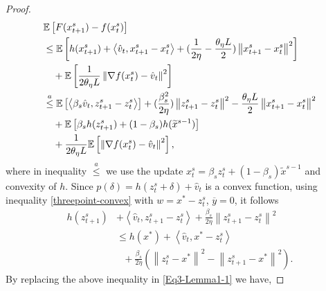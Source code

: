 \documentclass{article}
\newcommand*{\E}{\mathbb{E}}
\newcommand{\norm}[1]{\left\lVert#1\right\rVert}
\newcommand{\Iprod}[2]{\left\langle #1,#2\right\rangle}
\theoremstyle{definition}
\theoremstyle{remark}
\begin{document}
{\begin{proof}
\begin{gather}\label{Eq3-Lemma1-1}
\begin{split}
&\E \left[ F(x_{t+1}^s) -f(x_{t}^s)\right]\\
&\leq \E\left[h(x_{t+1}^s)+ \Iprod{\hat{v}_{t}}{x_{t+1}^s-x_{t}^s}+{(\frac{1}{2\eta}-\frac{\theta_{\eta} L}{2})}\norm{x_{t+1}^s-x_{t}^s}^2\right]\\
&~~~+\E\left[\frac{1}{2\theta_{\eta} L}\norm{\nabla f(x_{t}^s)-\hat{v}_{t}}^2\right]\\
&\stackrel{a}{\leq}\E\left[\Iprod{\beta_s\hat{v}_{t}}{z_{t+1}^s-z_{t}^s}\right]+{{(\frac{{ \beta_s^2}}{2\eta})}}\norm{z_{t+1}^s-z_{t}^s}^2-\frac{\theta_{\eta} L}{2}\norm{x_{t+1}^s-x_{t}^s}^2\\
&~~~+\E\left[\beta_s h(z_{t+1}^s)+(1-\beta_s) h(\widetilde{x}^{s-1})\right]\\
&~~~+\frac{1}{2\theta_{\eta} L}\E\left[\norm{\nabla f(x_{t}^s)-\hat{v}_{t}}^2\right],
\end{split}
\raisetag{15pt}
\end{gather}
where in inequality $\stackrel{a}{\leq}$ we use the update $x_t^s = \beta_s z_t^s+(1-\beta_s)\widetilde{x}^{s-1}$ and convexity of $h$. Since   $p(\delta) = h(z_t^s+\delta)+\hat{v}_{t}$ is a convex function, using inequality \eqref{threepoint-convex} with $w=x^*-z_{t}^s$, $\overline{y} = 0$, it follows
\begin{equation}
\begin{split}
h(z_{t+1}^s) &+ \Iprod{\hat{v}_{t}}{z_{t+1}^s-z_{t}^s}+{\frac{\beta_s}{2\eta}}\norm{z_{t+1}^s-z_{t}^s}^2  \\
&\leq h(x^*)+\Iprod{\hat{v}_{t}}{x^* - z_{t}^s}\\
&~~~+{\frac{\beta_s}{2\eta}}(\norm{z_{t}^s-x^*}^2-\norm{z_{t+1}^s-x^*}^2).  
\end{split}
\end{equation}
By replacing the above inequality in \eqref{Eq3-Lemma1-1} we have,


\end{proof}}
\end{document}
